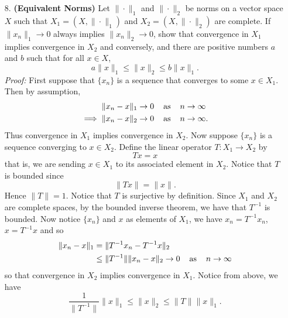 \documentclass{article}
\begin{document}
\begin{itemize}
    \item[8.] \textbf{(Equivalent Norms)} Let $\|\cdot \|_1$ and $\|\cdot \|_2$ be norms on a vector space $X$ such that $X_1 = (X, \|\cdot\|_1)$ and $X_2 = (X, \|\cdot\|_2)$ are complete. If $\|x_n\|_1 \to 0$ always implies $\|x_n\|_2 \to 0$, show that convergence in $X_1$ implies convergence in $X_2$ and conversely, and there are positive numbers $a$ and $b$ such that for all $x \in X$,
    \[a\|x\|_1 \leq \|x\|_2 \leq b\|x\|_1.\]
    \textit{Proof:} First suppose that $\{x_n\}$ is a sequence that converges to some $x \in X_1$. Then by assumption,
    \begin{align*}
        \|x_n - x\|_1 &\to 0 \hspace{0.4cm} \text{as} \hspace{0.4cm} n \to \infty\\
        \implies \|x_n - x\|_2 &\to 0 \hspace{0.4cm} \text{as} \hspace{0.4cm} n\to \infty.
    \end{align*}
    Thus convergence in $X_1$ implies convergence in $X_2$. Now suppose $\{x_n\}$ is a sequence converging to $x \in X_2$. Define the linear operator $T: X_1 \to X_2$ by 
    \[Tx = x\]
    that is, we are sending $x \in X_1$ to its associated element in $X_2$. Notice that $T$ is bounded since
    \[\|Tx\| = \|x\|.\]
    Hence $\|T\| = 1$. Notice that $T$ is surjective by definition. Since $X_1$ and $X_2$ are complete spaces, by the bounded inverse theorem, we have that $T^{-1}$ is bounded. Now notice $\{x_n\}$ and $x$ as elements of $X_1$, we have $x_n = T^{-1}x_n$, $x = T^{-1}x$ and so
    \begin{align*}
        \|x_n - x\|_1 &= \|T^{-1}x_n - T^{-1}x\|_2\\
        &\leq \|T^{-1}\|\|x_n - x\|_2 \to 0 \hspace{0.4cm} \text{as} \hspace{0.4cm} n \to \infty
    \end{align*}
    so that convergence in $X_2$ implies convergence in $X_1$. Notice from above, we have
    \[\frac{1}{\|T^{-1}\|}\|x\|_1 \leq \|x\|_2 \leq \|T\|\|x\|_1.\]

    
\end{itemize}
\end{document}

